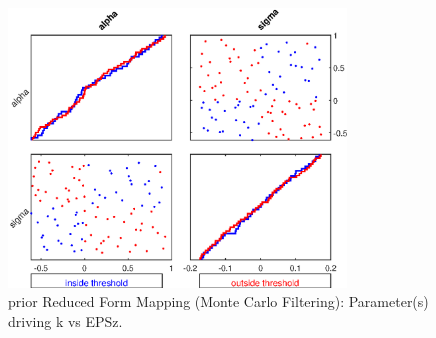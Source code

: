 
\begin{figure}[H]
\centering 
\includegraphics[width=0.8\textwidth]{RBC_kz/gsa/redform_prior/k_vs_EPSz_threshold/RBC_kz_prior_k_vs_EPSz_threshold}
\caption{prior Reduced Form Mapping (Monte Carlo Filtering): Parameter(s) driving k vs EPSz.}\label{Fig:RBC_kz_prior_k_vs_EPSz_threshold}
\end{figure}

